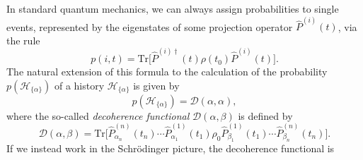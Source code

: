 \documentclass[rmp,aps,amsmath,amsfonts,noshowkeys,noshowpacs,12pt]{revtex4}
\begin{document}
In standard quantum mechanics, we can always assign probabilities to
single events, represented by the eigenstates of some projection
operator $\widehat{P}^{(i)}(t)$, via the rule
%
\begin{equation}
p(i,t)=\text{Tr} \bigl[ \widehat{P}^{(i)\dagger}(t) \rho(t_0)
\widehat{P}^{(i)}(t) \bigr].
\end{equation}
%
The natural extension of this formula to the calculation of the
probability $p(\mathcal{H}_{\{\alpha\}})$ of a history
$\mathcal{H}_{\{\alpha\}}$ is given by
%
\begin{equation}  \label{eq:cprob}
p(\mathcal{H}_{\{\alpha\}}) = \mathcal{D}(\alpha,\alpha), 
\end{equation}
%
where the so-called {\em decoherence functional}
$\mathcal{D}(\alpha,\beta)$ is defined by \citep{GellMann:1990:uz} 
%
\begin{equation} \label{eq:df}
\mathcal{D}(\alpha,\beta) = \text{Tr} \big[ \widehat{P}^{(n)}_{\alpha_n}(t_n) 
 \cdots \widehat{P}^{(1)}_{\alpha_{1}}(t_{1}) \rho_0 
\widehat{P}^{(1)}_{\beta_{1}}(t_{1}) \cdots
\widehat{P}^{(n)}_{\beta_{n}}(t_n) \big].
\end{equation}
%
If we instead work in the Schr\"odinger picture, the decoherence
functional is
\end{document}
